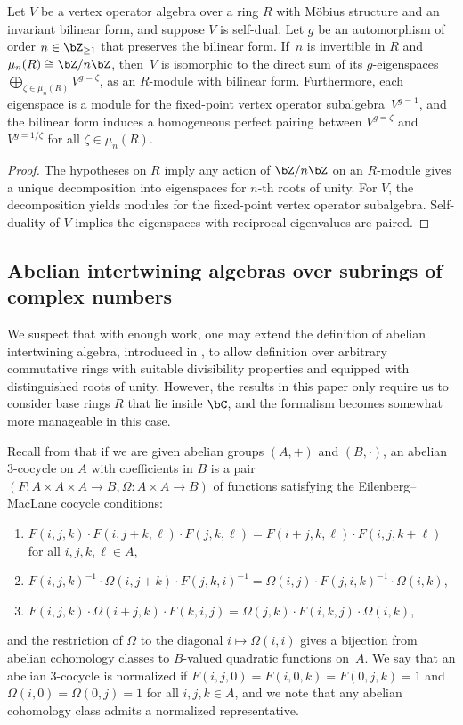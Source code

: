 \begin{lem} \label{lem:decomposition-is-still-self-dual}Let $V$ be a vertex operator algebra over a ring $R$ with M\"obius structure and an invariant bilinear form, and suppose $V$ is self-dual. Let $g$ be an automorphism of order $n \in \bZ_{\geq 1}$ that preserves the bilinear form. If~$n$ is invertible in $R$ and $\mu_n(R) \cong \bZ/n\bZ$, then~$V$ is isomorphic to the direct sum of its $g$-eigenspaces $\bigoplus_{\zeta \in \mu_n(R)} V^{g = \zeta}$, as an $R$-module with bilinear form. Furthermore, each eigenspace is a module for the fixed-point vertex operator subalgebra~$V^{g=1}$, and the bilinear form induces a homogeneous perfect pairing between $V^{g = \zeta}$ and~$V^{g = 1/\zeta}$ for all $\zeta \in \mu_n(R)$.
\end{lem}
\begin{proof}The hypotheses on $R$ imply any action of $\bZ/n\bZ$ on an $R$-module gives a unique decomposition into eigenspaces for $n$-th roots of unity. For $V$, the decomposition yields modules for the fixed-point vertex operator subalgebra. Self-duality of $V$ implies the eigenspaces with reciprocal eigenvalues are paired.
\end{proof}

\subsection{Abelian intertwining algebras over subrings of complex numbers}

We suspect that with enough work, one may extend the definition of abelian intertwining algebra, introduced in \cite{DL93}, to allow definition over arbitrary commutative rings with suitable divisibility properties and equipped with distinguished roots of unity. However, the results in this paper only require us to consider base rings $R$ that lie inside $\bC$, and the formalism becomes somewhat more manageable in this case.

Recall from \cite{M52} that if we are given abelian groups $(A,+)$ and $(B,\cdot)$, an abelian 3-cocycle on $A$ with coefficients in $B$ is a pair $(F\colon A \times A \times A \to B, \Omega\colon A \times A \to B)$ of functions satisfying the Eilenberg--MacLane cocycle conditions:
\begin{enumerate}\itemsep=0pt
\item[1)] $F(i,j,k) \cdot F(i,j+k,\ell) \cdot F(j,k,\ell) = F(i+j,k,\ell) \cdot F(i,j,k+\ell)$ for all $i,j,k,\ell \in A$,
\item[2)] $F(i,j,k)^{-1} \cdot \Omega(i,j+k) \cdot F(j,k,i)^{-1} = \Omega(i,j) \cdot F(j,i,k)^{-1} \cdot \Omega(i,k)$,
\item[3)] $F(i,j,k) \cdot \Omega(i+j,k) \cdot F(k,i,j) = \Omega(j,k) \cdot F(i,k,j) \cdot \Omega(i,k)$,
\end{enumerate}
and the restriction of $\Omega$ to the diagonal $i \mapsto \Omega(i,i)$ gives a bijection from abelian cohomology classes to $B$-valued quadratic functions on~$A$. We say that an abelian 3-cocycle is normalized if $F(i,j,0) = F(i,0,k) = F(0,j,k) = 1$ and $\Omega(i,0) = \Omega(0,j) = 1$ for all $i,j,k \in A$, and we note that any abelian cohomology class admits a normalized representative.

